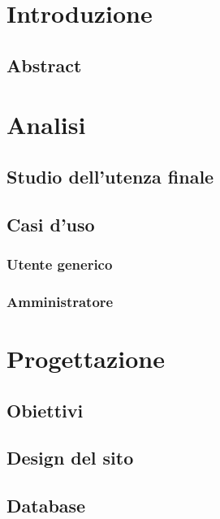 \documentclass[a4paper, oneside, openany, dvipsnames, table]{article}
\begin{document}
\copertina
\tableofcontents
\newpage
\section{Introduzione}
	
	\subsection{Abstract}
		
\newpage
\section{Analisi}
	
	\subsection{Studio dell'utenza finale}
		
	\subsection{Casi d'uso}
		
		\subsubsection{Utente generico}
			
		\subsubsection{Amministratore}
			
\newpage
\section{Progettazione}
	
	\subsection{Obiettivi}
		
	\subsection{Design del sito}
		
	\subsection{Database}
		
\newpage
\end{document}
